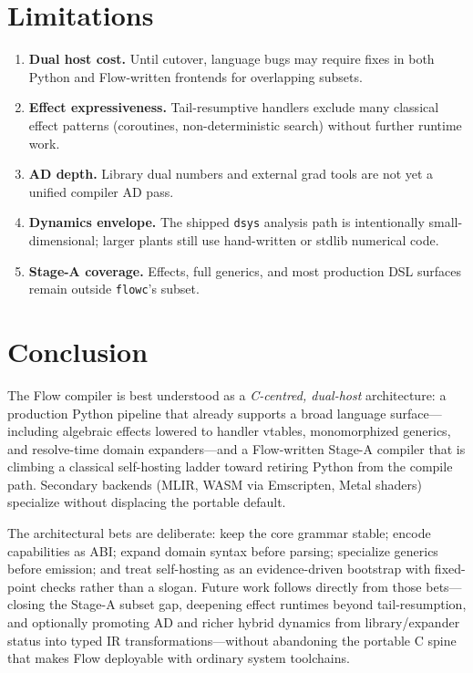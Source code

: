 \documentclass[11pt,a4paper]{article}
\theoremstyle{remark}
\begin{document}
\section{Limitations}
\label{sec:limits}

\begin{enumerate}[leftmargin=*]
  \item \textbf{Dual host cost.} Until cutover, language bugs may require fixes
        in both Python and Flow-written frontends for overlapping subsets.
  \item \textbf{Effect expressiveness.} Tail-resumptive handlers exclude many
        classical effect patterns (coroutines, non-deterministic search) without
        further runtime work.
  \item \textbf{AD depth.} Library dual numbers and external grad tools are not
        yet a unified compiler AD pass.
  \item \textbf{Dynamics envelope.} The shipped \texttt{dsys} analysis path is
        intentionally small-dimensional; larger plants still use hand-written or
        stdlib numerical code.
  \item \textbf{Stage-A coverage.} Effects, full generics, and most production
        DSL surfaces remain outside \texttt{flowc}'s subset.
\end{enumerate}

\section{Conclusion}
\label{sec:conclusion}

The Flow compiler is best understood as a \emph{C-centred, dual-host}
architecture: a production Python pipeline that already supports a broad
language surface---including algebraic effects lowered to handler vtables,
monomorphized generics, and resolve-time domain expanders---and a Flow-written
Stage-A compiler that is climbing a classical self-hosting ladder toward
retiring Python from the compile path. Secondary backends (MLIR, WASM via
Emscripten, Metal shaders) specialize without displacing the portable default.

The architectural bets are deliberate: keep the core grammar stable; encode
capabilities as ABI; expand domain syntax before parsing; specialize generics
before emission; and treat self-hosting as an evidence-driven bootstrap with
fixed-point checks rather than a slogan. Future work follows directly from
those bets---closing the Stage-A subset gap, deepening effect runtimes beyond
tail-resumption, and optionally promoting AD and richer hybrid dynamics from
library/expander status into typed IR transformations---without abandoning the
portable C spine that makes Flow deployable with ordinary system toolchains.
\end{document}

